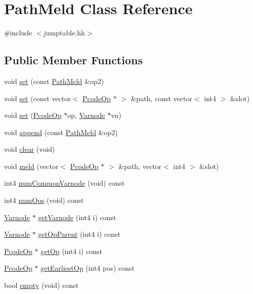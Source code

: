 \hypertarget{class_path_meld}{}\section{Path\+Meld Class Reference}
\label{class_path_meld}


{\ttfamily \#include $<$jumptable.\+hh$>$}

\subsection*{Public Member Functions}
\begin{DoxyCompactItemize}
\item 
void \mbox{\hyperlink{class_path_meld_a665ffb4a63f3c682f3b7a945069be46b}{set}} (const \mbox{\hyperlink{class_path_meld}{Path\+Meld}} \&op2)
\item 
void \mbox{\hyperlink{class_path_meld_a38b8ca6475525a777370f9ef2a14b283}{set}} (const vector$<$ \mbox{\hyperlink{class_pcode_op}{Pcode\+Op}} $\ast$ $>$ \&path, const vector$<$ int4 $>$ \&slot)
\item 
void \mbox{\hyperlink{class_path_meld_ac1c67e77757d48ed47dcc35758fb97af}{set}} (\mbox{\hyperlink{class_pcode_op}{Pcode\+Op}} $\ast$op, \mbox{\hyperlink{class_varnode}{Varnode}} $\ast$vn)
\item 
void \mbox{\hyperlink{class_path_meld_a9e3817333b4f263c515375c88bb23199}{append}} (const \mbox{\hyperlink{class_path_meld}{Path\+Meld}} \&op2)
\item 
void \mbox{\hyperlink{class_path_meld_a902af8ce7d496c1bcf34ed5e40b1be26}{clear}} (void)
\item 
void \mbox{\hyperlink{class_path_meld_a62b0bd2c4340c6f116bdcde53fb23aad}{meld}} (vector$<$ \mbox{\hyperlink{class_pcode_op}{Pcode\+Op}} $\ast$ $>$ \&path, vector$<$ int4 $>$ \&slot)
\item 
int4 \mbox{\hyperlink{class_path_meld_a62cd3e5f48e44c7f91ae528d9226125c}{num\+Common\+Varnode}} (void) const
\item 
int4 \mbox{\hyperlink{class_path_meld_ac5bbe9f261e99d4b5b946c85680e4d10}{num\+Ops}} (void) const
\item 
\mbox{\hyperlink{class_varnode}{Varnode}} $\ast$ \mbox{\hyperlink{class_path_meld_a884fd25c249e5b270d91a7856f57a88e}{get\+Varnode}} (int4 i) const
\item 
\mbox{\hyperlink{class_varnode}{Varnode}} $\ast$ \mbox{\hyperlink{class_path_meld_a0a31740ea7908d307213753a099b04cb}{get\+Op\+Parent}} (int4 i) const
\item 
\mbox{\hyperlink{class_pcode_op}{Pcode\+Op}} $\ast$ \mbox{\hyperlink{class_path_meld_a2d9b5c63f0ba90e495534fb838e4ed33}{get\+Op}} (int4 i) const
\item 
\mbox{\hyperlink{class_pcode_op}{Pcode\+Op}} $\ast$ \mbox{\hyperlink{class_path_meld_a991b7429bf694ad8c71fe74252ad0cdc}{get\+Earliest\+Op}} (int4 pos) const
\item 
bool \mbox{\hyperlink{class_path_meld_a129f73389540c04d27c1b8cfd927c136}{empty}} (void) const
\end{DoxyCompactItemize}


